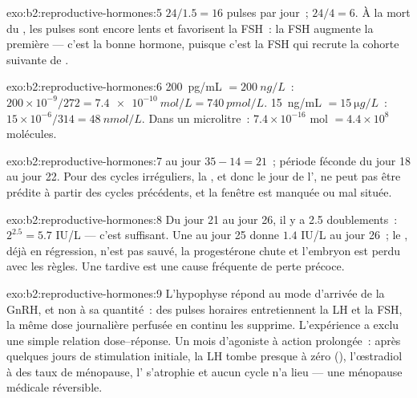 \begin{solution}{exo:b2:reproductive-hormones:5}
$24/1.5 = 16$ pulses par jour~; $24/4 = 6$. À la mort du ,
les pulses sont encore lents et favorisent la FSH~: la FSH augmente la
première --- c'est la bonne hormone, puisque c'est la FSH qui recrute la
cohorte suivante de .
\end{solution}

\begin{solution}{exo:b2:reproductive-hormones:6}
\qty{200}{pg/mL} $= \qty{200}{ng/L}$~: $200\times 10^{-9}/272 =
\qty{7.4e-10}{mol/L} = \qty{740}{pmol/L}$. \qty{15}{ng/mL} $=
\qty{15}{\micro g/L}$~: $15\times 10^{-6}/314 = \qty{48}{nmol/L}$. Dans
un microlitre~: $7.4\times 10^{-16}$ mol $= 4.4\times 10^{8}$
molécules.
\end{solution}

\begin{solution}{exo:b2:reproductive-hormones:7}
 au jour $35 - 14 = 21$~; période féconde du jour 18 au
jour 22. Pour des cycles irréguliers, la , et donc le
jour de l', ne peut pas être prédite à partir des cycles
précédents, et la fenêtre est manquée ou mal située.
\end{solution}

\begin{solution}{exo:b2:reproductive-hormones:8}
Du jour 21 au jour 26, il y a 2.5 doublements~: $2^{2.5} = 5.7$ IU/L ---
c'est suffisant. Une  au jour 25 donne $1.4$ IU/L au jour 26~;
le , déjà en régression, n'est pas sauvé, la progestérone
chute et l'embryon est perdu avec les règles. Une  tardive est
une cause fréquente de perte précoce.
\end{solution}

\begin{solution}{exo:b2:reproductive-hormones:9}
L'hypophyse répond au mode d'arrivée de la GnRH, et non à sa quantité~:
des pulses horaires entretiennent la LH et la FSH, la même dose
journalière perfusée en continu les supprime. L'expérience a exclu une
simple relation dose--réponse. Un mois d'agoniste à action prolongée~:
après quelques jours de stimulation initiale, la LH tombe presque à zéro
(), l'œstradiol à des taux de
ménopause, l' s'atrophie et aucun cycle n'a lieu --- une
ménopause médicale réversible.
\end{solution}


